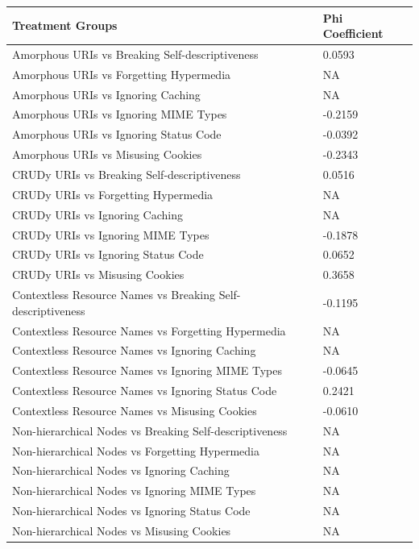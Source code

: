 \documentclass[a4paper,12pt]{article}
\begin{document}
\begin{table}[ht!]
    \centering
       \begin{tabular}{|p{90mm}|p{50mm}|}
\hline \textbf{Treatment Groups} & \textbf{Phi Coefficient} 
\\ \hline 
Amorphous URIs vs Breaking Self-descriptiveness & 0.0593
\\ \hline
Amorphous URIs vs Forgetting Hypermedia & NA
\\ \hline
Amorphous URIs vs Ignoring Caching & NA
\\ \hline
Amorphous URIs vs Ignoring MIME Types & -0.2159
\\ \hline
Amorphous URIs vs Ignoring Status Code & -0.0392
\\ \hline
Amorphous URIs vs Misusing Cookies & -0.2343
\\ \hline
CRUDy URIs vs Breaking Self-descriptiveness & 0.0516
\\ \hline
CRUDy URIs vs Forgetting Hypermedia & NA
\\ \hline
CRUDy URIs vs Ignoring Caching & NA
\\ \hline
CRUDy URIs vs Ignoring MIME Types & -0.1878
\\ \hline
CRUDy URIs vs Ignoring Status Code & 0.0652
\\ \hline
CRUDy URIs vs Misusing Cookies & 0.3658
\\ \hline
Contextless Resource Names vs Breaking Self-descriptiveness & -0.1195
\\ \hline
Contextless Resource Names vs Forgetting Hypermedia & NA
\\ \hline
Contextless Resource Names vs Ignoring Caching & NA
\\ \hline
Contextless Resource Names vs Ignoring MIME Types & -0.0645
\\ \hline
Contextless Resource Names vs Ignoring Status Code & 0.2421
\\ \hline
Contextless Resource Names vs Misusing Cookies & -0.0610
\\ \hline
Non-hierarchical Nodes vs Breaking Self-descriptiveness & NA
\\ \hline
Non-hierarchical Nodes vs Forgetting Hypermedia & NA
\\ \hline
Non-hierarchical Nodes vs Ignoring Caching & NA
\\ \hline
Non-hierarchical Nodes vs Ignoring MIME Types & NA
\\ \hline
Non-hierarchical Nodes vs Ignoring Status Code & NA
\\ \hline
Non-hierarchical Nodes vs Misusing Cookies & NA

\end{tabular}
\end{table}
\end{document}
